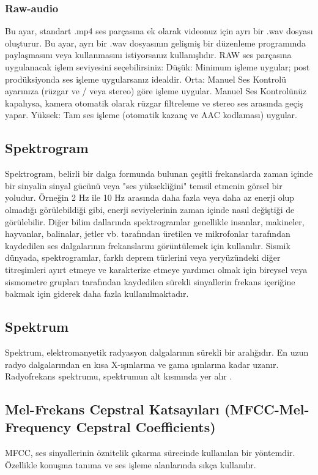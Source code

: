 \documentclass[12pt, a4paper]{article}
\begin{document}
			\subsubsection{Raw-audio} 	  \vspace*{1\baselineskip}
			Bu ayar, standart .mp4 ses parçasına ek olarak videonuz için ayrı bir .wav dosyası oluşturur. Bu ayar, ayrı bir .wav dosyasının gelişmiş bir düzenleme programında paylaşmasını veya kullanmasını istiyorsanız kullanışlıdır. RAW ses parçasına uygulanacak işlem seviyesini seçebilirsiniz: 
			Düşük: Minimum işleme uygular; post prodüksiyonda ses işleme uygularsanız idealdir.
			Orta: Manuel Ses Kontrolü ayarınıza (rüzgar ve / veya stereo) göre işleme uygular. Manuel Ses Kontrolünüz kapalıysa, kamera otomatik olarak rüzgar filtreleme ve stereo ses arasında geçiş yapar.
			Yüksek: Tam ses işleme (otomatik kazanç ve AAC kodlaması) uygular.
			
			\subsection{Spektrogram} 	  \vspace*{1\baselineskip}
			Spektrogram, belirli bir dalga formunda bulunan çeşitli frekanslarda zaman içinde bir sinyalin sinyal gücünü veya "ses yüksekliğini" temsil etmenin görsel bir yoludur.  Örneğin 2 Hz ile 10 Hz arasında daha fazla veya daha az enerji olup olmadığı görülebildiği gibi, enerji seviyelerinin zaman içinde nasıl değiştiği de görülebilir.  Diğer bilim dallarında spektrogramlar genellikle insanlar, makineler, hayvanlar, balinalar, jetler vb. tarafından üretilen ve mikrofonlar tarafından kaydedilen ses dalgalarının frekanslarını görüntülemek için kullanılır.  Sismik dünyada, spektrogramlar, farklı deprem türlerini veya yeryüzündeki diğer titreşimleri ayırt etmeye ve karakterize etmeye yardımcı olmak için bireysel veya sismometre grupları tarafından kaydedilen sürekli sinyallerin frekans içeriğine bakmak için giderek daha fazla kullanılmaktadır. \cite{spektrogram}
			
			\subsection{Spektrum} 	
			Spektrum, elektromanyetik radyasyon dalgalarının sürekli bir aralığıdır. En uzun radyo dalgalarından en kısa X-ışınlarına ve gama ışınlarına kadar uzanır. Radyofrekans spektrumu, spektrumun alt kısmında yer alır \cite{spektrum}.
			
			\subsection{Mel-Frekans Cepstral Katsayıları (MFCC-Mel-Frequency Cepstral Coefficients) }
			MFCC, ses sinyallerinin öznitelik çıkarma sürecinde kullanılan bir yöntemdir. Özellikle konuşma tanıma ve ses işleme alanlarında sıkça kullanılır.
			
\end{document}
